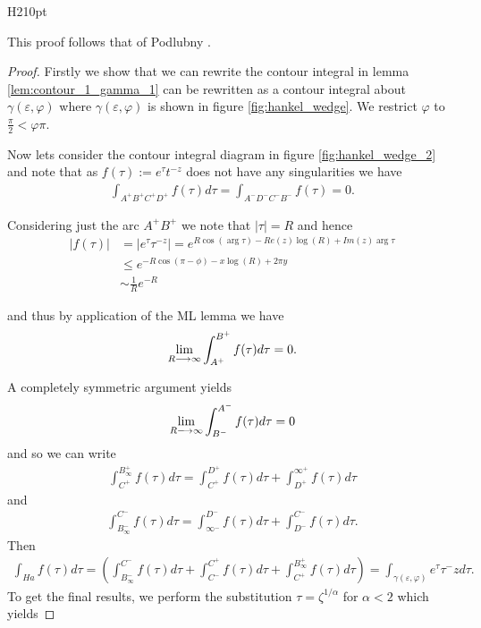 \begin{wrapfigure}{H}{210pt}
    
    \caption{ Integration contour for $ \gamma(\varepsilon, \varphi) $}
    \label{fig:hankel_wedge_2}
\end{wrapfigure}
This proof follows that of Podlubny \cite{Podlubny1999}.
\begin{proof}

Firstly we show that we can rewrite the contour integral in lemma \ref{lem:contour_1_gamma_1} can be rewritten as a contour
integral about $ \gamma(\varepsilon, \varphi) $ where $ \gamma(\varepsilon, \varphi) $ is shown in figure \ref{fig:hankel_wedge}. We restrict $ \varphi $ to $ \frac{\pi}{2} < \varphi \pi $. 

Now lets consider the contour integral diagram in figure \ref{fig:hankel_wedge_2} and note that as $ f(\tau) := e^\tau t^{-z} $ does not have any singularities we have
\begin{align}
    \int_{A^+ B^+ C^+ D^+} f(\tau) d\tau = \int_{A^-D^-C^-B^-} f(\tau) = 0.
\end{align}

Considering just the arc $ A^+B^+ $ we note that $ |\tau| = R $ and hence
\begin{align*}
    |f(\tau)| &= |e^\tau \tau^{-z}| = e^{R\cos(\arg \tau) - Re(z) \log(R) + Im(z) \arg \tau} \\
      &\leq e^{-R\cos(\pi - \phi) - x \log(R) + 2 \pi y} \\
      &\sim \frac{1}{R}e^{-R}
\end{align*}

and thus by application of the ML lemma we have
\begin{align*}
    \lim_{R \longrightarrow \infty} \int_{A^+}^{B^+} f(\tau) d\tau = 0.
\end{align*}


A completely symmetric argument yields
\begin{align*}
    \lim_{R \longrightarrow \infty} \int_{B^-}^{A^-} f(\tau) d\tau = 0
\end{align*}
and so we can write
\begin{align*}
    \int_{C^+}^{B_\infty^+} f(\tau)d\tau = \int_{C^+}^{D^+} f(\tau)d\tau + \int_{D^+}^{\infty^+} f(\tau)d\tau
\end{align*}
and
\begin{align*}
    \int_{B_\infty^-}^{C^-} f(\tau)d\tau = \int_{\infty^-}^{D^-} f(\tau)d\tau + \int_{D^-}^{C^-} f(\tau)d\tau.
\end{align*}
Then
\begin{align*}
    \int_{Ha} f(\tau) d\tau = \left( \int_{B_\infty^-}^{C^-} f(\tau)d\tau + \int_{C^-}^{C^+} f(\tau)d\tau +  \int_{C^+}^{B_\infty^+} f(\tau)d\tau \right) = \int_{\gamma(\varepsilon, \varphi)}e^\tau \tau^-z d\tau.
\end{align*}
To get the final results, we perform the substitution $ \tau = \zeta^{1/\alpha} $ for $ \alpha < 2 $
which yields


\end{proof}
